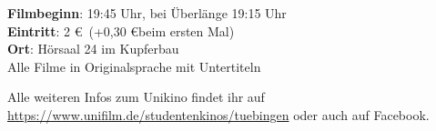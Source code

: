 \textbf{Filmbeginn}: 19:45 Uhr, bei Überlänge 19:15 Uhr\\
\textbf{Eintritt}: 2 \euro ~(+0,30 \euro beim ersten Mal)\\
\textbf{Ort}: Hörsaal 24 im Kupferbau\\
Alle Filme in Originalsprache mit Untertiteln

Alle weiteren Infos zum Unikino findet ihr auf \url{https://www.unifilm.de/studentenkinos/tuebingen} oder auch auf Facebook.
